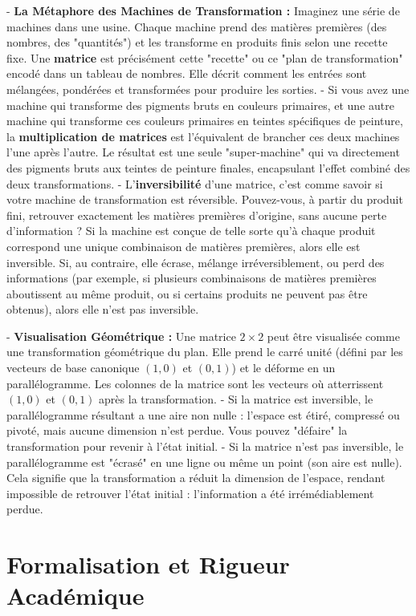 \documentclass[12pt,a4paper]{report}
\begin{document}
-   \textbf{La Métaphore des Machines de Transformation :} Imaginez une série de machines dans une usine. Chaque machine prend des matières premières (des nombres, des "quantités") et les transforme en produits finis selon une recette fixe. Une \textbf{matrice} est précisément cette "recette" ou ce "plan de transformation" encodé dans un tableau de nombres. Elle décrit comment les entrées sont mélangées, pondérées et transformées pour produire les sorties.
    -   Si vous avez une machine qui transforme des pigments bruts en couleurs primaires, et une autre machine qui transforme ces couleurs primaires en teintes spécifiques de peinture, la \textbf{multiplication de matrices} est l'équivalent de brancher ces deux machines l'une après l'autre. Le résultat est une seule "super-machine" qui va directement des pigments bruts aux teintes de peinture finales, encapsulant l'effet combiné des deux transformations.
    -   L'\textbf{inversibilité} d'une matrice, c'est comme savoir si votre machine de transformation est réversible. Pouvez-vous, à partir du produit fini, retrouver exactement les matières premières d'origine, sans aucune perte d'information ? Si la machine est conçue de telle sorte qu'à chaque produit correspond une unique combinaison de matières premières, alors elle est inversible. Si, au contraire, elle écrase, mélange irréversiblement, ou perd des informations (par exemple, si plusieurs combinaisons de matières premières aboutissent au même produit, ou si certains produits ne peuvent pas être obtenus), alors elle n'est pas inversible.

-   \textbf{Visualisation Géométrique :} Une matrice $2 \times 2$ peut être visualisée comme une transformation géométrique du plan. Elle prend le carré unité (défini par les vecteurs de base canonique $(1,0)$ et $(0,1)$) et le déforme en un parallélogramme. Les colonnes de la matrice sont les vecteurs où atterrissent $(1,0)$ et $(0,1)$ après la transformation.
    -   Si la matrice est inversible, le parallélogramme résultant a une aire non nulle : l'espace est étiré, compressé ou pivoté, mais aucune dimension n'est perdue. Vous pouvez "défaire" la transformation pour revenir à l'état initial.
    -   Si la matrice n'est pas inversible, le parallélogramme est "écrasé" en une ligne ou même un point (son aire est nulle). Cela signifie que la transformation a réduit la dimension de l'espace, rendant impossible de retrouver l'état initial : l'information a été irrémédiablement perdue.

\section{Formalisation et Rigueur Académique}
\end{document}
